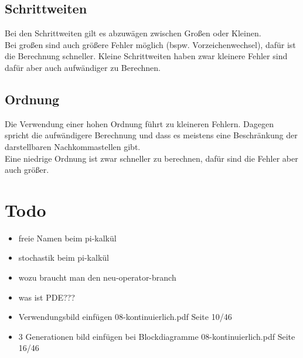 \documentclass[11pt, fleqn, a4paper, leqno]{scrartcl} %
\begin{document}
		\subsection{Schrittweiten}
			Bei den Schrittweiten gilt es abzuwägen zwischen Großen oder Kleinen.\\
			Bei großen sind auch größere Fehler möglich (bspw. Vorzeichenwechsel), dafür ist die Berechnung schneller. Kleine Schrittweiten haben zwar kleinere Fehler sind dafür aber auch aufwändiger zu Berechnen.\\
		\subsection{Ordnung}
			Die Verwendung einer hohen Ordnung führt zu kleineren Fehlern. Dagegen spricht die aufwändigere Berechnung und dass es meistens eine Beschränkung der darstellbaren Nachkommastellen gibt.\\
			Eine niedrige Ordnung ist zwar schneller zu berechnen, dafür sind die Fehler aber auch größer.



	
\section{Todo}
	\begin{itemize}
		\item freie Namen beim pi-kalkül
		\item stochastik beim pi-kalkül
		\item wozu braucht man den neu-operator-branch
		\item was ist PDE???
		\item Verwendungsbild einfügen 08-kontinuierlich.pdf Seite 10/46
		\item 3 Generationen bild einfügen bei Blockdiagramme 08-kontinuierlich.pdf Seite 16/46
	\end{itemize}			
\end{document}
